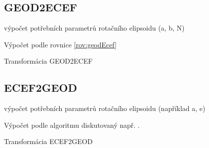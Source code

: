 \documentclass[11pt,a4paper]{article}
\begin{document}
\begin{appendices}
\subsection{GEOD2ECEF} \label{appGeod2Ecef}

\begin{algorithm}[H]
 výpočet potřebních parametrů rotačního elipsoidu (a, b, N)
 
 Výpočet podle rovnice \ref{rov:geodEcef}
 \caption{Transformácia GEOD2ECEF}
\end{algorithm} 

\subsection{ECEF2GEOD} \label{appEcef2Geod}

\begin{algorithm}[H]
 výpočet potřebních parametrů rotačního elipsoidu (například a, e)
 
 Výpočet podle algoritmu diskutovaný např. \cite{Vermeille2011}.
 \caption{Transformácia ECEF2GEOD}
\end{algorithm} 

\end{appendices}
\end{document}
